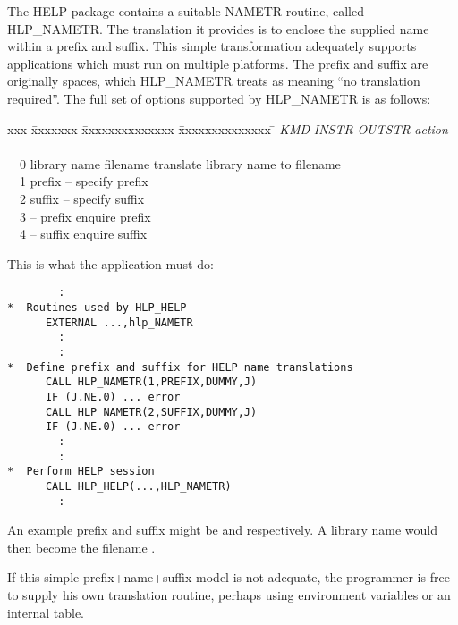 The HELP package contains a suitable NAMETR routine, called
HLP\_NAMETR.  The translation it provides is to
enclose the supplied name within a prefix and suffix.  This
simple transformation adequately supports applications
which must run on multiple platforms.
The prefix and
suffix are originally spaces, which HLP\_NAMETR treats as meaning
``no translation required''.  The full set of options supported by
HLP\_NAMETR is as follows:
\begin{tabbing}
xxx \= xxxxxxx \= xxxxxxxxxxxxxx \= xxxxxxxxxxxxxx \= \kill
\> {\it KMD} \> {\it INSTR} \> {\it OUTSTR} \> {\it action} \\ \\
\> ~~0 \> library name \> filename \> translate library name to filename \\
\> ~~1 \> prefix \> -- \> specify prefix \\
\> ~~2 \> suffix \> -- \> specify suffix \\
\> ~~3 \> -- \> prefix \> enquire prefix \\
\> ~~4 \> -- \> suffix \> enquire suffix
\end{tabbing}
This is what the application must do:
\begin{verbatim}
        :
*  Routines used by HLP_HELP
      EXTERNAL ...,hlp_NAMETR
        :
        :
*  Define prefix and suffix for HELP name translations
      CALL HLP_NAMETR(1,PREFIX,DUMMY,J)
      IF (J.NE.0) ... error
      CALL HLP_NAMETR(2,SUFFIX,DUMMY,J)
      IF (J.NE.0) ... error
        :
        :
*  Perform HELP session
      CALL HLP_HELP(...,HLP_NAMETR)
        :
\end{verbatim}
An example prefix and suffix might be  and
 respectively.  A library name  would
then become the filename .

If this simple prefix+name+suffix model is not adequate, the programmer
is free to supply his own translation routine, perhaps using
environment variables or an internal table.

